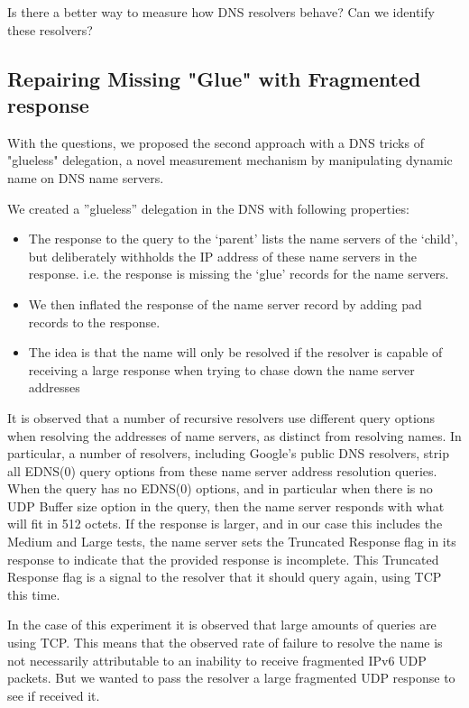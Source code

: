 Is there a better way to measure how DNS resolvers behave? Can we identify
these resolvers?

\subsection{Repairing Missing "Glue" with Fragmented response}


With the questions, we proposed the second approach with a DNS tricks
of "glueless" delegation, a novel measurement mechanism by manipulating
dynamic name on DNS name servers.

We created a ”glueless” delegation in the DNS with following properties:

\begin{itemize}
  \item The response to the   query to the ‘parent’ lists   the   name servers of
  the ‘child’, but deliberately withholds the   IP address of these name
  servers in the response. i.e. the response is missing the ‘glue’ records
  for the name servers.
  \item We then inflated the response of the name server record by adding
  pad records to the response.
  \item The idea is  that the name will only be resolved if the resolver
  is capable of   receiving a large response when  trying to chase   down the
  name server addresses
\end{itemize}

It is observed that a number of recursive resolvers use different query options
when resolving the addresses of name servers, as distinct from resolving names.
In particular, a number of resolvers, including Google’s public DNS resolvers,
strip all EDNS(0) query options from these name server address resolution
queries. When the query has no EDNS(0) options, and in particular when there is
no UDP Buffer size option in the query, then the name server responds with what
will fit in 512 octets. If the response is larger, and in our case this includes
the Medium and Large tests, the name server sets the Truncated Response flag in
its response to indicate that the provided response is incomplete. This Truncated
Response flag is a signal to the resolver that it should query again, using TCP
this time.

In the case of this experiment it is observed that large amounts of queries are using TCP.
This means that the observed rate of failure to resolve the name is not necessarily
attributable to an inability to receive fragmented IPv6 UDP packets. But we   wanted to
pass the resolver a  large fragmented UDP response to see if received it.

